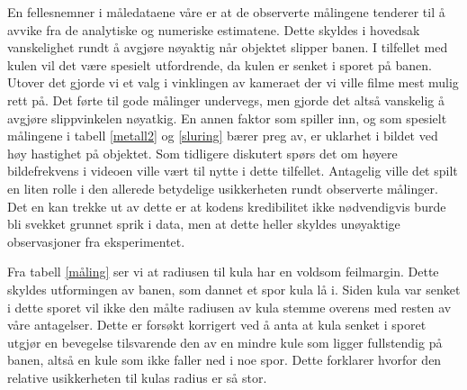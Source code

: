 \documentclass[5p]{elsarticle}
\begin{document}
	En fellesnemner i måledataene våre er at de observerte målingene tenderer til å avvike fra de analytiske og numeriske estimatene. Dette skyldes i hovedsak vanskelighet rundt å avgjøre nøyaktig når objektet slipper banen. I tilfellet med kulen vil det være spesielt utfordrende, da kulen er senket i sporet på banen. Utover det gjorde vi et valg i vinklingen av kameraet der vi ville filme mest mulig rett på. Det førte til gode målinger undervegs, men gjorde det altså vanskelig å avgjøre slippvinkelen nøyatkig. En annen faktor som spiller inn, og som spesielt målingene i tabell \ref{metall2} og \ref{sluring} bærer preg av, er uklarhet i bildet ved høy hastighet på objektet. Som tidligere diskutert spørs det om høyere bildefrekvens i videoen ville vært til nytte i dette tilfellet. Antagelig ville det spilt en liten rolle i den allerede betydelige usikkerheten rundt observerte målinger. Det en kan trekke ut av dette er at kodens kredibilitet ikke nødvendigvis burde bli svekket grunnet sprik i data, men at dette heller skyldes unøyaktige observasjoner fra eksperimentet.
	
	Fra tabell \ref{måling} ser vi at radiusen til kula har en voldsom feilmargin. Dette skyldes utformingen av banen, som dannet et spor kula lå i. Siden kula var senket i dette sporet vil ikke den målte radiusen av kula stemme overens med resten av våre antagelser. Dette er forsøkt korrigert ved å anta at kula senket i sporet utgjør en bevegelse tilsvarende den av en mindre kule som ligger fullstendig på banen, altså en kule som ikke faller ned i noe spor. Dette forklarer hvorfor den relative usikkerheten til kulas radius er så stor.
	
	
\end{document}
